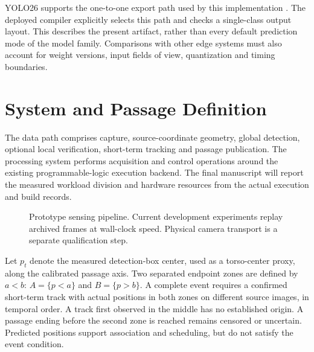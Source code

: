 \documentclass[journal]{IEEEtran}
\begin{document}
YOLO26 supports the one-to-one export path used by this implementation \cite{yolo26}. The deployed compiler explicitly selects this path and checks a single-class output layout. This describes the present artifact, rather than every default prediction mode of the model family. Comparisons with other edge systems must also account for weight versions, input fields of view, quantization and timing boundaries.

\section{System and Passage Definition}
The data path comprises capture, source-coordinate geometry, global detection, optional local verification, short-term tracking and passage publication. The processing system performs acquisition and control operations around the existing programmable-logic execution backend. The final manuscript will report the measured workload division and hardware resources from the actual execution and build records.

\begin{figure}[!t]
\centering
{}
\caption{Prototype sensing pipeline. Current development experiments replay archived frames at wall-clock speed. Physical camera transport is a separate qualification step.}
\label{fig:pipeline}
\end{figure}

Let $p_t$ denote the measured detection-box center, used as a torso-center proxy, along the calibrated passage axis. Two separated endpoint zones are defined by $a<b$: $A=\{p<a\}$ and $B=\{p>b\}$. A complete event requires a confirmed short-term track with actual positions in both zones on different source images, in temporal order. A track first observed in the middle has no established origin. A passage ending before the second zone is reached remains censored or uncertain. Predicted positions support association and scheduling, but do not satisfy the event condition.
\end{document}
